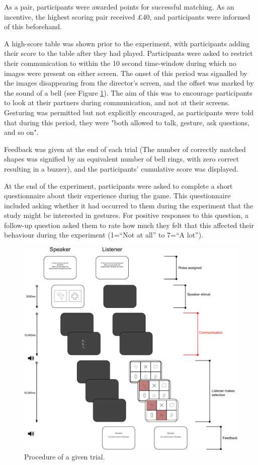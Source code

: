 \documentclass[a4paper,man,natbib]{apa6}
\begin{document}
As a pair, participants were awarded points for successful matching.
As an incentive, the highest scoring pair received \pounds 40, and participants were informed of this beforehand.

A high-score table was shown prior to the experiment, with participants adding their score to the table after they had played.
Participants were asked to restrict their communication to within the 10 second time-window during which no images were present on either screen. 
The onset of this period was signalled by the images disappearing from the director's screen, and the offset was marked by the sound of a bell (see Figure \ref{fig:trial}).
The aim of this was to encourage participants to look at their partners during communication, and not at their screens. 
Gesturing was permitted but not explicitly encouraged, as participants were told that during this period, they were "both allowed to talk, gesture, ask questions, and so on".

Feedback was given at the end of each trial (The number of correctly matched shapes was signified by an equivalent number of bell rings, with zero correct resulting in a buzzer), and the participants' cumulative score was displayed.

At the end of the experiment, participants were asked to complete a short questionnaire about their experience during the game.
This questionnaire included asking whether it had occurred to them during the experiment that the study might be interested in gestures.
For positive responses to this question, a follow-up question asked them to rate how much they felt that this affected their behaviour during the experiment (1=``Not at all'' to 7=``A lot'').

\begin{figure}
  \centering
	\includegraphics[width=\linewidth]{trial.png}
  \caption{Procedure of a given trial.}
  \label{fig:trial}
\end{figure}
\end{document}
